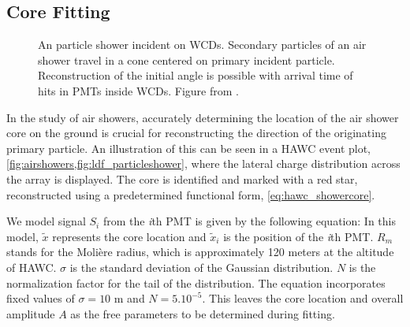 \subsection{Core Fitting} \label{sec:hawc_core_fitting}

\begin{figure}[h!]
    \caption{An particle shower incident on WCDs. Secondary particles of an air shower travel in a cone centered on primary incident particle. Reconstruction of the initial angle is possible with arrival time of hits in PMTs inside WCDs. Figure from \cite{thesis_Zigg}.}
    \label{fig:shower_shape}
\end{figure}

In the study of air showers, accurately determining the location of the air shower core on the ground is crucial for reconstructing the direction of the originating primary particle.
An illustration of this can be seen in a HAWC event plot, \cref{fig:airshowers,fig:ldf_particleshower}, where the lateral charge distribution across the array is displayed.
The core is identified and marked with a red star, reconstructed using a predetermined functional form, \cref{eq:hawc_showercore}.

We model signal $S_i$ from the \textit{i}th PMT is given by the following equation:
\showercore
In this model, $\tilde{x}$ represents the core location and $\tilde{x}_i$ is the position of the \textit{i}th PMT.
$R_m$ stands for the Molière radius, which is approximately 120 meters at the altitude of HAWC.
$\sigma$ is the standard deviation of the Gaussian distribution.
$N$ is the normalization factor for the tail of the distribution.
The equation incorporates fixed values of $\sigma = 10$ m and $N=5.10^{-5}$.
This leaves the core location and overall amplitude $A$ as the free parameters to be determined during fitting.

